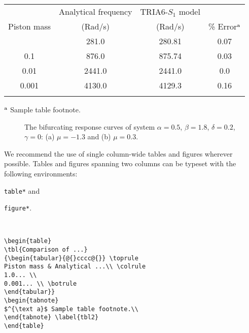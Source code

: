 \documentclass{ws-bme}
\begin{document}
\begin{multicols}{2}
\begin{table*}
{\begin{tabular}{@{}cccc@{}} \toprule
& Analytical frequency & TRIA6-$S_1$ model &  \\
Piston mass & (Rad/s) & (Rad/s) & \% Error$^{\text a}$ \\ \colrule
1.0\hphantom{00} & \hphantom{0}281.0 & \hphantom{0}280.81 & 0.07 \\
0.1\hphantom{00} & \hphantom{0}876.0 & \hphantom{0}875.74 & 0.03 \\
0.01\hphantom{0} & 2441.0 & 2441.0\hphantom{0} & 0.0\hphantom{0} \\
0.001 & 4130.0 & 4129.3\hphantom{0} & 0.16\\ \botrule
\end{tabular}
}
\begin{tabnote}
$^{\text a}$ Sample table footnote.\\
\end{tabnote}
\label{tbl2}
\end{table*}

\begin{figure*}
\begin{center}
\end{center}
\caption{The bifurcating response curves of system
$\alpha=0.5$, $\beta=1.8$, $\delta=0.2$, $\gamma=0$: (a)
$\mu=-1.3$ and (b) $\mu=0.3$.}
\label{fig2}
\end{figure*}

We recommend the use of single column-wide tables and figures wherever
possible. Tables and \hbox{figures} spanning two columns can be typeset
with the following environments:

\begin{itemlist}
\item \verb|table*| and
\item \verb|figure*|.
\end{itemlist}

\\[-3pt]

\begin{verbatim}
\begin{table*}
\tbl{Comparison of ...}
{\begin{tabular}{@{}cccc@{}} \toprule
Piston mass & Analytical ...\\ \colrule
1.0... \\
0.001... \\ \botrule
\end{tabular}}
\begin{tabnote}
$^{\text a}$ Sample table footnote.\\
\end{tabnote} \label{tbl2}
\end{table*}
\end{verbatim}


\end{multicols}
\end{document}
